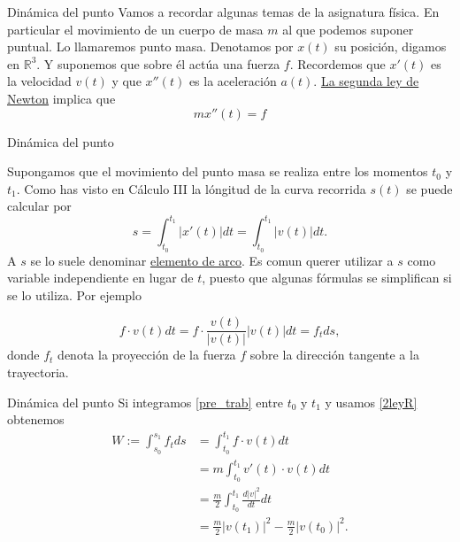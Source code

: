 \documentclass[handout,hyperref={colorlinks=true}]{beamer}
\newcommand{\rr}{\mathbb{R}}
\begin{document}
\begin{frame}{Dinámica del punto}
Vamos a recordar algunas temas de la asignatura física. En particular  el movimiento de un cuerpo de masa $m$ al que podemos suponer puntual. Lo llamaremos punto masa. Denotamos por $x(t)$ su posición, digamos en $\rr^3$. Y suponemos 
que sobre él actúa una fuerza $f$. Recordemos que $x'(t)$ es la velocidad $v(t)$ y que $x''(t)$ es la aceleración $a(t)$.  
\href{http://es.wikipedia.org/wiki/Leyes_de_Newton\#Segunda_ley_de_Newton_o_ley_de_fuerza}{La segunda ley de Newton} implica que 
\begin{equation}\label{2leyR}\boxed{mx''(t)=f}\end{equation}



\end{frame}

\begin{frame}{Dinámica del punto}

Supongamos que el movimiento del punto masa se realiza entre los momentos $t_0$ y $t_1$. Como has visto en Cálculo III la lóngitud de la curva recorrida 
$s(t)$ se puede calcular por
\begin{equation}\label{2ley}s=\int_{t_0}^{t_1}|x'(t)|dt=\int_{t_0}^{t_1}|v(t)|dt.\end{equation}
A $s$ se lo suele denominar \href{http://es.wikipedia.org/wiki/Longitud_de_arco}{elemento de arco}. Es comun querer utilizar a $s$ como variable independiente en 
lugar de $t$, puesto que algunas fórmulas se simplifican si se lo utiliza. Por ejemplo

\begin{equation}\label{pre_trab} f\cdot v(t)dt=f\cdot\frac{v(t)}{|v(t)|}|v(t)|dt=f_tds,\end{equation}
donde $f_t$ denota la proyección de la fuerza $f$ sobre la dirección tangente a la trayectoria.




\end{frame}

\begin{frame}{Dinámica del punto}
Si integramos \eqref{pre_trab} entre $t_0$ y $t_1$ y usamos \eqref{2leyR} obtenemos
\[\begin{split} W:=\int_{s_0}^{s_1}f_tds&=\int_{t_0}^{t_1} f\cdot v(t)dt\\
   & =m \int_{t_0}^{t_1} v'(t)\cdot v(t)dt\\
   &=\frac{m}{2} \int_{t_0}^{t_1} \frac{d|v|^2}{dt}dt\\
   &=\frac{m}{2}|v(t_1)|^2-\frac{m}{2}|v(t_0)|^2.  \end{split}\]
\end{frame}
\end{document}
